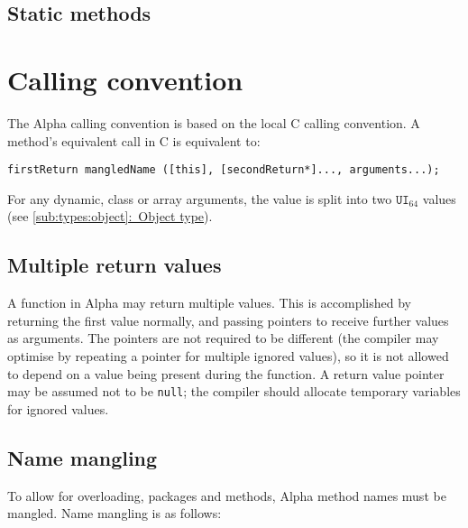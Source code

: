 \documentclass{article}
\newcommand{\R}[1]{\mathtt{#1}}
\newcommand{\textref}[2]{\hyperref[#1]{\underline{\ref*{#1}:~#2}}}
\begin{document}
\subsection{Static methods}
\label{sub:methods:static}

\section{Calling convention}
\label{sec:cconv}
The Alpha calling convention is based on the local C calling convention. A
method's equivalent call in C is equivalent to:

\begin{verbatim}
firstReturn mangledName ([this], [secondReturn*]..., arguments...);
\end{verbatim}

For any dynamic, class or array arguments, the value is split into two
$\R{UI}_{64}$ values (see
\textref{sub:types:object}{Object type}).

\subsection{Multiple return values}
\label{sub:cconv:multiple}
A function in Alpha may return multiple values. This is accomplished by
returning the first value normally, and passing pointers to receive further
values as arguments. The pointers are not required to be different (the
compiler may optimise by repeating a pointer for multiple ignored values), so
it is not allowed to depend on a value being present during the function.
A return value pointer may be assumed not to be \texttt{null}; the compiler
should allocate temporary variables for ignored values.

\subsection{Name mangling}
\label{sub:cconv:mangling}

To allow for overloading, packages and methods, Alpha method names must be
mangled. Name mangling is as follows:
\end{document}
